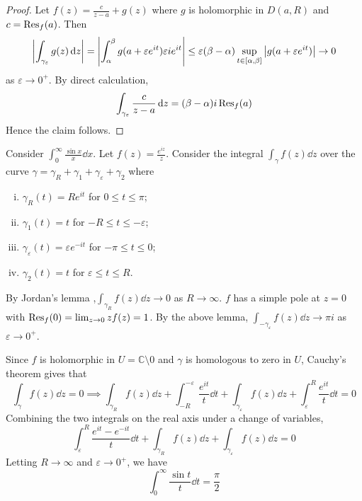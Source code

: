 \begin{proof}
	Let \( f(z) = \frac{c}{z-a} + g(z) \) where \( g \) is holomorphic in \( D(a,R) \) and \( c = \Res_f(a) \).
	Then
	\[ \abs{\int_{\gamma_\varepsilon} g(z) \dd{z}} = \abs{\int_\alpha^\beta g(a+\varepsilon e^{it}) \varepsilon i e^{it}} \leq \varepsilon (\beta - \alpha) \sup_{t \in [\alpha,\beta]} \abs{g(a+\varepsilon e^{it})} \to 0 \]
	as \( \varepsilon \to 0^+ \).
	By direct calculation,
	\[ \int_{\gamma_\varepsilon} \frac{c}{z-a} \dd{z} = (\beta-\alpha)i\Res_f(a) \]
	Hence the claim follows.
\end{proof}
\begin{example}
	Consider \( \int_0^\infty \frac{\sin x}{x} \dd{x} \).
	Let \( f(z) = \frac{e^{iz}}{z} \).
	Consider the integral \( \int_\gamma f(z) \dd{z} \) over the curve \( \gamma = \gamma_R + \gamma_1 + \gamma_\varepsilon + \gamma_2 \) where
	\begin{enumerate}[(i)]
		\item \( \gamma_R(t) = Re^{it} \) for \( 0 \leq t \leq \pi \);
		\item \( \gamma_1(t) = t \) for \( -R \leq t \leq -\varepsilon \);
		\item \( \gamma_\varepsilon(t) = \varepsilon e^{-it} \) for \( -\pi \leq t \leq 0 \);
		\item \( \gamma_2(t) = t \) for \( \varepsilon \leq t \leq R \).
	\end{enumerate}
	By Jordan's lemma ,\( \int_{\gamma_R} f(z) \dd{z} \to 0 \) as \( R \to \infty \).
	\( f \) has a simple pole at \( z = 0 \) with \( \Res_f(0) = \lim_{z \to 0} z f(z) = 1 \).
	By the above lemma, \( \int_{-\gamma_\varepsilon} f(z) \dd{z} \to \pi i \) as \( \varepsilon \to 0^+ \).

	Since \( f \) is holomorphic in \( U = \mathbb C \setminus \qty{0} \) and \( \gamma \) is homologous to zero in \( U \), Cauchy's theorem gives that
	\[ \int_\gamma f(z) \dd{z} = 0 \implies \int_{\gamma_R} f(z) \dd{z} + \int_{-R}^{-\varepsilon} \frac{e^{it}}{t} \dd{t} + \int_{\gamma_\varepsilon} f(z) \dd{z} + \int_{\varepsilon}^R \frac{e^{it}}{t} \dd{t} = 0 \]
	Combining the two integrals on the real axis under a change of variables,
	\[ \int_{\varepsilon}^R \frac{e^{it} - e^{-it}}{t} \dd{t} + \int_{\gamma_R} f(z) \dd{z} + \int_{\gamma_{\varepsilon}} f(z) \dd{z} = 0 \]
	Letting \( R \to \infty \) and \( \varepsilon \to 0^+ \), we have
	\[ \int_0^\infty \frac{\sin t}{t} \dd{t} = \frac{\pi}{2} \]
\end{example}
